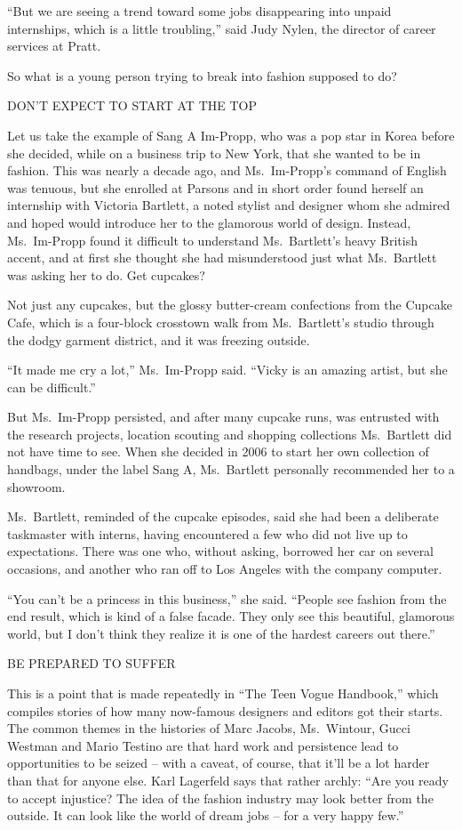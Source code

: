 ﻿\documentclass[12pt]{article}
\begin{document}
``But we are seeing a trend toward some jobs disappearing into unpaid internships, which is a little
troubling,'' said Judy Nylen, the director of career services at Pratt.

So what is a young person trying to break into fashion supposed to do?

DON'T EXPECT TO START AT THE TOP

Let us take the example of Sang A Im-Propp, who was a pop star in Korea before she decided, while on
a business trip to New York, that she wanted to be in fashion. This was nearly a decade ago, and
Ms.~Im-Propp's command of English was tenuous, but she enrolled at Parsons and in short order found
herself an internship with Victoria Bartlett, a noted stylist and designer whom she admired and
hoped would introduce her to the glamorous world of design. Instead, Ms.~Im-Propp found it difficult
to understand Ms.~Bartlett's heavy British accent, and at first she thought she had misunderstood
just what Ms.~Bartlett was asking her to do. Get cupcakes?

Not just any cupcakes, but the glossy butter-cream confections from the Cupcake Cafe, which is a
four-block crosstown walk from Ms.~Bartlett's studio through the dodgy garment district, and it was
freezing outside.

``It made me cry a lot,'' Ms.~Im-Propp said. ``Vicky is an amazing artist, but she can be
difficult.''

But Ms.~Im-Propp persisted, and after many cupcake runs, was entrusted with the research projects,
location scouting and shopping collections Ms.~Bartlett did not have time to see. When she decided
in 2006 to start her own collection of handbags, under the label Sang A, Ms.~Bartlett personally
recommended her to a showroom.

Ms.~Bartlett, reminded of the cupcake episodes, said she had been a deliberate taskmaster with
interns, having encountered a few who did not live up to expectations. There was one who, without
asking, borrowed her car on several occasions, and another who ran off to Los Angeles with the
company computer.

``You can't be a princess in this business,'' she said. ``People see fashion from the end result,
which is kind of a false facade. They only see this beautiful, glamorous world, but I don't think
they realize it is one of the hardest careers out there.''

BE PREPARED TO SUFFER

This is a point that is made repeatedly in ``The Teen Vogue Handbook,'' which compiles stories of
how many now-famous designers and editors got their starts. The common themes in the histories of
Marc Jacobs, Ms.~Wintour, Gucci Westman and Mario Testino are that hard work and persistence lead to
opportunities to be seized -- with a caveat, of course, that it'll be a lot harder than that for
anyone else. Karl Lagerfeld says that rather archly: ``Are you ready to accept injustice? The idea
of the fashion industry may look better from the outside. It can look like the world of dream jobs
-- for a very happy few.''
\end{document}
